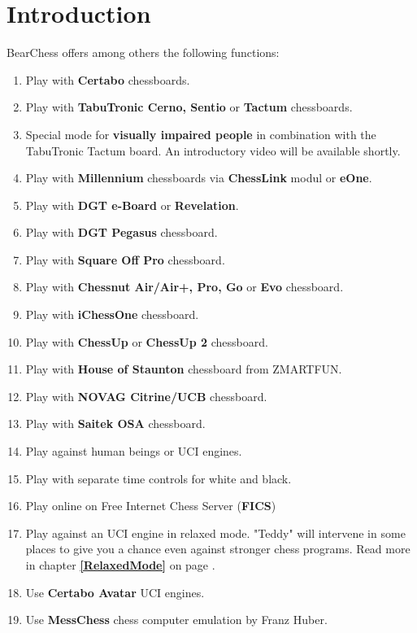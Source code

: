 \documentclass[11pt,a4paper]{article}
\begin{document}
	\section{Introduction}
	BearChess offers among others the following functions:
	\begin{enumerate}
		\item Play with \textbf{Certabo} chessboards.
		\item Play with \textbf{TabuTronic Cerno, Sentio} or \textbf{Tactum} chessboards.
		\item Special mode for \textbf{visually impaired people} in combination with the TabuTronic Tactum board. An introductory video will be available shortly.
		\item Play with \textbf{Millennium} chessboards via \textbf{ChessLink} modul or \textbf{eOne}.
		\item Play with \textbf{DGT e-Board} or \textbf{Revelation}.	  
		\item Play with \textbf{DGT Pegasus} chessboard.	  
		\item Play with \textbf{Square Off Pro} chessboard.	  	  
		\item Play with \textbf{Chessnut Air/Air+, Pro, Go} or \textbf{Evo}  chessboard.	  	  	  
		\item Play with \textbf{iChessOne} chessboard.	  	  	  	  
		\item Play with \textbf{ChessUp} or \textbf{ChessUp 2} chessboard.	  	  	  	  	  
        \item Play with \textbf{House of Staunton} chessboard from ZMARTFUN.
		\item Play with \textbf{NOVAG Citrine/UCB} chessboard.
		\item Play with \textbf{Saitek OSA} chessboard.	  
		\item Play against human beings or UCI engines.
		\item Play with separate time controls for white and black.
		\item Play online on Free Internet Chess Server (\textbf{FICS})
		\item Play against an UCI engine in relaxed mode. "Teddy" will intervene in some places to give you a chance even against stronger chess programs. Read more in chapter \textbf{\ref{RelaxedMode}  } on page \pageref{RelaxedMode}.  	  
		\item Use \textbf{Certabo Avatar} UCI engines.  	  
		\item Use \textbf{MessChess} chess computer emulation by Franz Huber.  	    	  

\end{enumerate}
\end{document}

